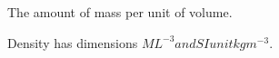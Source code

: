 The amount of mass per unit of volume.
\par
Density has dimensions $ML^{-3} and SI unit kgm^{-3}.$ 
